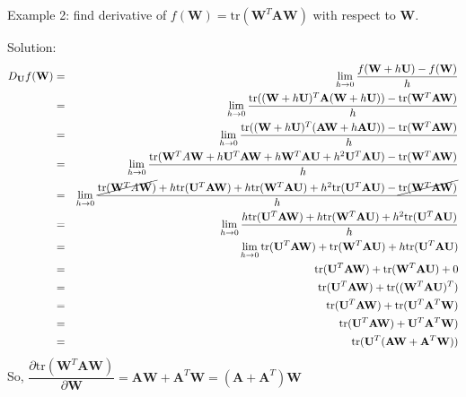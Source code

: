 \documentclass[conference,final,11pt,technote,onecolumn]{IEEEtran}\usepackage[]{graphicx}\usepackage[]{color}
\begin{document}
Example 2: find derivative of $f(\mathbf{W})=\text{tr}(\mathbf{W}^T\mathbf{A}\mathbf{W})$ with respect to $\mathbf{W}$.

Solution: \begin{eqnarray}
\nonumber D_\mathbf{U}f(\mathbf{W}) &=& \lim_{h\rightarrow 0}\dfrac{f(\mathbf{W}+h\mathbf{U})-f(\mathbf{W})}{h}\\
\nonumber &=& \lim_{h\rightarrow 0} \dfrac{\text{tr}((\mathbf{W}+h\mathbf{U})^T\mathbf{A}(\mathbf{W}+h\mathbf{U}))-\text{tr}(\mathbf{W}^T\mathbf{A}\mathbf{W})}{h}\\
\nonumber &=& \lim_{h\rightarrow 0} \dfrac{\text{tr}((\mathbf{W}+h\mathbf{U})^T(\mathbf{A}\mathbf{W}+h\mathbf{A}\mathbf{U}))-\text{tr}(\mathbf{W}^T\mathbf{A}\mathbf{W})}{h}\\
\nonumber &=& \lim_{h\rightarrow 0} \dfrac{\text{tr}(\mathbf{W}^TA\mathbf{W}+h\mathbf{U}^T\mathbf{AW}+h\mathbf{W}^T\mathbf{AU}+h^2\mathbf{U}^T\mathbf{AU})-\text{tr}(\mathbf{W}^T\mathbf{A}\mathbf{W})}{h}\\
\nonumber &=& \lim_{h\rightarrow 0} \dfrac{\cancel{\text{tr}(\mathbf{W}^TA\mathbf{W})}+h\text{tr}(\mathbf{U}^T\mathbf{AW})+h\text{tr}(\mathbf{W}^T\mathbf{AU})+h^2\text{tr}(\mathbf{U}^T\mathbf{AU})-\cancel{\text{tr}(\mathbf{W}^T\mathbf{A}\mathbf{W})}}{h}\\
\nonumber &=& \lim_{h\rightarrow 0} \dfrac{h\text{tr}(\mathbf{U}^T\mathbf{AW})+h\text{tr}(\mathbf{W}^T\mathbf{AU})+h^2\text{tr}(\mathbf{U}^T\mathbf{AU})}{h}\\
\nonumber &=& \lim_{h\rightarrow 0} \text{tr}(\mathbf{U}^T\mathbf{AW})+\text{tr}(\mathbf{W}^T\mathbf{AU})+h\text{tr}(\mathbf{U}^T\mathbf{AU})\\
\nonumber &=& \text{tr}(\mathbf{U}^T\mathbf{AW})+\text{tr}(\mathbf{W}^T\mathbf{AU})+0\\
\nonumber &=& \text{tr}(\mathbf{U}^T\mathbf{AW})+\text{tr}((\mathbf{W}^T\mathbf{AU})^T)\\
\nonumber &=& \text{tr}(\mathbf{U}^T\mathbf{AW})+\text{tr}(\mathbf{U}^T\mathbf{A}^T\mathbf{W})\\
\nonumber &=& \text{tr}(\mathbf{U}^T\mathbf{AW})+\mathbf{U}^T\mathbf{A}^T\mathbf{W})\\
\nonumber &=& \text{tr}(\mathbf{U}^T(\mathbf{AW}+\mathbf{A}^T\mathbf{W}))
\end{eqnarray}
So, $\dfrac{\partial \text{tr}(\mathbf{W}^T\mathbf{A}\mathbf{W})}{\partial \mathbf{W}} =  \mathbf{AW}+\mathbf{A}^T\mathbf{W} = (\mathbf{A}+\mathbf{A}^T)\mathbf{W}$
\end{document}
